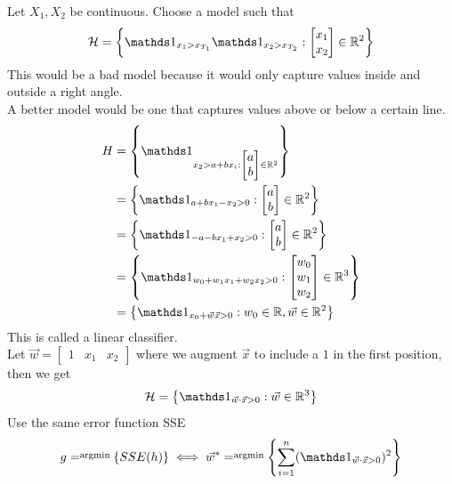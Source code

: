 \documentclass[12pt]{article}
\begin{document}
Let $X_1,X_2$ be continuous. Choose a model such that $$ \mathcal{H} = \set{ \indicator{x_1 > x_{T_1}}\indicator{x_2 > x_{T_2}} : \begin{bmatrix} x_1 \\ x_2 \end{bmatrix} \in \mathbb{R}^2 } $$ This would be a bad model because it would only capture values inside and outside a right angle. \\ A better model would be one that captures values above or below a certain line. $$ \begin{aligned} H &= \set{ \indicator{x_2 > a + bx_i : \begin{bmatrix} a \\ b \end{bmatrix} \in \mathbb{R}^2}} \\ &= \set{\indicator{a + bx_1 - x_2 > 0} : \begin{bmatrix} a \\ b \end{bmatrix} \in \mathbb{R}^2} \\ &= \set{\indicator{-a-bx_1 + x_2 > 0} : \begin{bmatrix} a \\ b \end{bmatrix} \in \mathbb{R}^2} \\ &= \set{\indicator{w_0 + w_1x_1 + w_2x_2 > 0}: \begin{bmatrix} w_0 \\ w_1 \\ w_2 \end{bmatrix} \in \mathbb{R}^3} \\ &= \set{\indicator{x_0 + \vec{w}\vec{x} > 0} : w_0 \in \mathbb{R}, \vec{w} \in \mathbb{R}^2} \end{aligned} $$ 
This is called a linear classifier. \\ 
Let $\vec{w} = \begin{bmatrix} 1 & x_1 & x_2 \end{bmatrix}$ where we augment $\vec{x}$ to include a $1$ in the first position, then we get $$ \mathcal{H} = \set{\indicator{\vec{w}\cdot \vec{x} > 0}: \vec{w} \in \mathbb{R}^3} $$ 
Use the same error function SSE 
$$g = \argmin{} \set{SSE(h)} \iff \vec{w}^* = \argmin{} \set{\sum_{i=1}^n (\indicator{\vec{w} \cdot \vec{x} > 0})^2} $$ 
\end{document}

